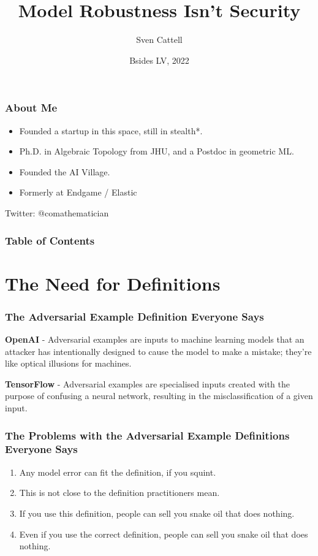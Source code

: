 \documentclass{beamer}
\title{Model Robustness Isn’t Security}
\author{Sven Cattell}
\date{Bsides LV, 2022}
\begin{document}
\frame{\titlepage}
\begin{frame}
\frametitle{About Me}
\begin{itemize}
\item Founded a startup in this space, still in stealth*.
\item Ph.D. in Algebraic Topology from JHU, and a Postdoc in geometric ML.
\item Founded the AI Village.
\item Formerly at Endgame / Elastic
\end{itemize}
\vspace{20pt}

Twitter: {@}comathematician
\end{frame}

\begin{frame}
\frametitle{Table of Contents}
\tableofcontents
\end{frame}

\section{The Need for Definitions}

\begin{frame}
    \frametitle{The Adversarial Example Definition Everyone Says}
    \begin{definition}
        \textbf{OpenAI} - Adversarial examples are inputs to machine learning models that an attacker has intentionally designed to cause the model to make a mistake; they're like optical illusions for machines.
    \end{definition}
    \begin{definition}
        \textbf{TensorFlow} - Adversarial examples are specialised inputs created with the purpose of confusing a neural network, resulting in the misclassification of a given input.
    \end{definition}
\end{frame}

\begin{frame}
    \frametitle{The Problems with the Adversarial Example Definitions Everyone Says}
    \begin{enumerate}
        \item Any model error can fit the definition, if you squint.
        \item This is not close to the definition practitioners mean.
        \item If you use this definition, people can sell you snake oil that does nothing.
        \item Even if you use the correct definition, people can sell you snake oil that does nothing.
    \end{enumerate}
\end{frame}
\end{document}
